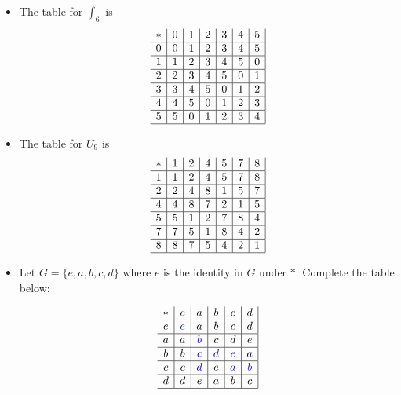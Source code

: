     \begin{example}
        \mbox{}

        \begin{itemize}
            \item The table for \(\int_6\) is 
            \[
                \begin{array}{c|c|c|c|c|c|c|}
                    * & 0 & 1 & 2 & 3 & 4 & 5 \\ \hline
                    0 & 0 & 1 & 2 & 3 & 4 & 5 \\ \hline
                    1 & 1 & 2 & 3 & 4 & 5 & 0 \\ \hline
                    2 & 2 & 3 & 4 & 5 & 0 & 1 \\ \hline
                    3 & 3 & 4 & 5 & 0 & 1 & 2 \\ \hline
                    4 & 4 & 5 & 0 & 1 & 2 & 3 \\ \hline
                    5 & 5 & 0 & 1 & 2 & 3 & 4 \\ \hline
                \end{array}
            \]

            \item The table for \(U_9\) is
            \[
                \begin{array}{c|c|c|c|c|c|c|}
                    * & 1 & 2 & 4 & 5 & 7 & 8 \\ \hline
                    1 & 1 & 2 & 4 & 5 & 7 & 8 \\ \hline
                    2 & 2 & 4 & 8 & 1 & 5 & 7 \\ \hline
                    4 & 4 & 8 & 7 & 2 & 1 & 5 \\ \hline
                    5 & 5 & 1 & 2 & 7 & 8 & 4 \\ \hline
                    7 & 7 & 5 & 1 & 8 & 4 & 2 \\ \hline
                    8 & 8 & 7 & 5 & 4 & 2 & 1 \\ \hline
                \end{array}
            \]

            \item Let \(G = \{e, a, b, c, d\}\) where \(e\) is the identity in \(G\) under \(*\). Complete the table below: 

            \[
                \begin{array}{c|c|c|c|c|c|}
                    * & e & a & b & c & d \\ \hline
                    e & \color{blue}{e} & a & b & c & d \\ \hline
                    a & a & \color{blue}{b} & c & d & e \\ \hline
                    b & b & \color{blue}{c} & \color{blue}{d} & \color{blue}{e} & a \\ \hline
                    c & c & \color{blue}{d} & e & \color{blue}{a} & \color{blue}{b} \\ \hline
                    d & d & e & a & b & c \\ \hline
                \end{array}
            \]
        \end{itemize}
    \end{example}


